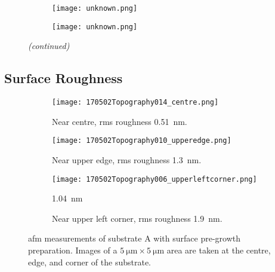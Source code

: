 \begin{figure}[htbp]
\ContinuedFloat
    \centering
    \begin{subfigure}[t]{\textwidth}
          \begin{minipage}[t]{0.49\linewidth}
            \centering
            \texttt{[image: unknown.png]}
          \end{minipage}
          \hspace{0.02\linewidth}
          \begin{minipage}[t]{0.49\linewidth}
            \centering
            \texttt{[image: unknown.png]}
          \end{minipage}
        \caption{}\label{fig:add_label}
    \end{subfigure}
    \captionsetup{list=no}
    \caption{\emph{(continued)}}
\end{figure}


\subsection{Surface Roughness}

\begin{figure}[htbp]
    \centering
    \begin{subfigure}[t]{\linewidth}
        \centering
        \texttt{[image: 170502Topography014\_centre.png]}
        \caption{Near centre, \ac{rms} roughness \SI{0.51}{\nano\metre}.} %
    \end{subfigure}%
    \par\bigskip
    \begin{subfigure}[t]{\linewidth}
        \centering
        \texttt{[image: 170502Topography010\_upperedge.png]}
        \caption{Near upper edge, \ac{rms} roughness \SI{1.3}{\nano\metre}.} %
    \end{subfigure}%
    \par\bigskip
    \begin{subfigure}[t]{\linewidth}
        \centering
        \texttt{[image: 170502Topography006\_upperleftcorner.png]}
        \caption{Near upper left corner, \ac{rms} roughness \SI{1.9}{\nano\metre}.}\SI{1,04}{\nano\metre}
    \end{subfigure}%
    \caption[\Ac{afm} of substrate A with surface pre-growth preparation.]{\Acf{afm} measurements of substrate A with surface pre-growth preparation. Images of a $\SI{5}{\micro\metre}\times\SI{5}{\micro\metre}$ area are taken at the centre, edge, and corner of the substrate.}\label{fig:afm_subAb}
\end{figure} %

